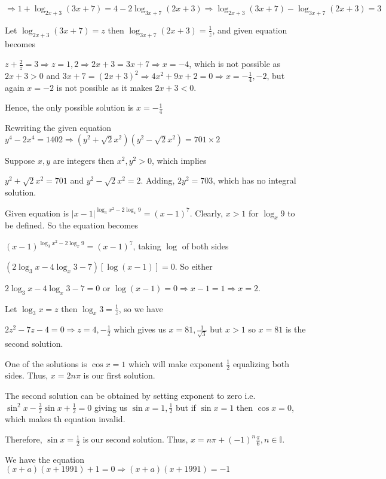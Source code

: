   $\Rightarrow 1 + \log_{2x + 3}(3x + 7) = 4 - 2\log_{3x + 7}(2x + 3)\Rightarrow \log_{2x + 3}(3x + 7) -
  \log_{3x + 7}(2x + 3) = 3$

  Let $\log_{2x + 3}(3x + 7) = z$ then $\log_{3x + 7}(2x + 3) = \frac{1}{z}$, and given equation becomes

  $z + \frac{2}{z} = 3 \Rightarrow z = 1, 2 \Rightarrow 2x + 3 = 3x + 7 \Rightarrow x = -4$, which is not
  possible as $2x + 3 > 0$ and $3x + 7 = (2x + 3)^2 \Rightarrow 4x^2 + 9x + 2 = 0\Rightarrow x =
  -\frac{1}{4}, -2$, but again $x = -2$ is not possible as it makes $2x + 3 < 0$.

  Hence, the only possible solution is $x = -\frac{1}{4}$
\item Rewriting the given equation $y^4 - 2x^4 = 1402 \Rightarrow (y^2 +\sqrt{2}x^2)(y^2 - \sqrt{2}x^2) =
  701\times2$

  Suppose $x, y$ are integers then $x^2, y^2 > 0$, which implies

  $y^2 + \sqrt{2}x^2 = 701$ and $y^2 - \sqrt{2}x^2 = 2$. Adding, $2y^2 = 703$, which has no integral
  solution.
\item Given equation is $|x - 1|^{\log_3x^2 - 2\log_x9} = (x - 1)^7$. Clearly, $x > 1$ for $\log_x9$ to be
  defined. So the equation becomes

  $(x - 1)^{\log_3x^2 - 2\log_x9} = (x - 1)^7$, taking $\log$ of both sides

  $(2\log_3x - 4\log_x3 - 7)[\log(x - 1)] = 0$. So either

  $2\log_3x - 4\log_x3 - 7 = 0$ or $\log(x - 1) = 0 \Rightarrow x - 1 = 1 \Rightarrow x = 2$.

  Let $\log_3x = z$ then $\log_x3 = \frac{1}{z}$, so we have

  $2z^2 - 7z - 4 = 0 \Rightarrow z = 4, -\frac{1}{2}$ which gives us $x = 81, \frac{1}{\sqrt{3}}$ but $x >
  1$ so $x = 81$ is the second solution.
\item One of the solutions is $\cos x = 1$ which will make exponent $\frac{1}{2}$ equalizing both
  sides. Thus, $x = 2n\pi$ is our first solution.

  The second solution can be obtained by setting exponent to zero i.e. $\sin^2x - \frac{3}{2}\sin x +
  \frac{1}{2} = 0$ giving us $\sin x = 1, \frac{1}{2}$ but if $\sin x = 1$ then $\cos x = 0$, which makes th
  equation invalid.

  Therefore, $\sin x = \frac{1}{2}$ is our second solution. Thus, $x = n\pi + (-1)^n\frac{\pi}{6},
  n\in\mathbb{I}$.
\item We have the equation $(x + a)(x + 1991) + 1 = 0 \Rightarrow (x + a)(x + 1991) = -1$


